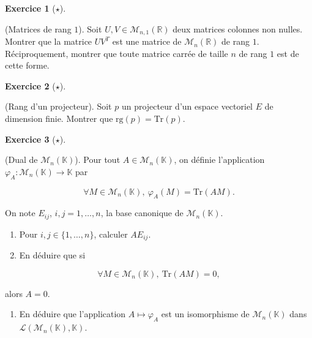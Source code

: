 \documentclass[
  french,
  letterpaper,
  DIV=11,
  numbers=noendperiod]{scrreprt}
\providecommand{\tightlist}{%
  \setlength{\itemsep}{0pt}\setlength{\parskip}{0pt}}
\theoremstyle{plain}
\theoremstyle{definition}
\theoremstyle{plain}
\theoremstyle{plain}
\theoremstyle{definition}
\newtheorem{exercise}{Exercice}[chapter]
\theoremstyle{definition}
\theoremstyle{plain}
\theoremstyle{remark}
\begin{document}
\begin{exercise}[\(\star\)]\protect\hypertarget{exr-03-0007}{}\label{exr-03-0007}

(Matrices de rang \(1\)). Soit \(U,V\in\mathcal{M}_{n,1}(\mathbb{R})\)
deux matrices colonnes non nulles. Montrer que la matrice \(UV^T\) est
une matrice de \(\mathcal{M}_{n}(\mathbb{R})\) de rang \(1\).
Réciproquement, montrer que toute matrice carrée de taille \(n\) de rang
\(1\) est de cette forme.

\end{exercise}

\begin{exercise}[\(\star\)]\protect\hypertarget{exr-03-0004}{}\label{exr-03-0004}

(Rang d'un projecteur). Soit \(p\) un projecteur d'un espace vectoriel
\(E\) de dimension finie. Montrer que
\(\mathrm{rg}(p) = \mathrm{Tr}(p)\).

\end{exercise}

\begin{exercise}[\(\star\)]\protect\hypertarget{exr-03-dual}{}\label{exr-03-dual}

(Dual de \(\mathcal{M}_{n}(\mathbb{K})\)). Pour tout
\(A \in \mathcal{M}_{n}(\mathbb{K})\), on définie l'application
\(\varphi_{A}: \mathcal{M}_{n}(\mathbb{K}) \to \mathbb{K}\) par

\[
   \forall M \in \mathcal{M}_{n}(\mathbb{K}),\ \varphi_A (M) = \mathrm{Tr}(AM).
\]

On note \(E_{ij}\), \(i,j =1,\dots,n\), la base canonique de
\(\mathcal{M}_{n}(\mathbb{K})\).

\begin{enumerate}
\def\labelenumi{\arabic{enumi}.}
\item
  Pour \(i,j \in \{1,\dots,n\}\), calculer \(AE_{ij}\).
\item
  En déduire que si
\end{enumerate}

\[
   \forall M \in \mathcal{M}_{n}(\mathbb{K}),\ \mathrm{Tr}(AM)=0,
\]

alors \(A = 0\).

\begin{enumerate}
\def\labelenumi{\arabic{enumi}.}
\setcounter{enumi}{2}
\tightlist
\item
  En déduire que l'application \(A \mapsto \varphi_{A}\) est un
  isomorphisme de \(\mathcal{M}_{n}(\mathbb{K})\) dans
  \(\mathcal{L}(\mathcal{M}_{n}(\mathbb{K}),\mathbb{K})\).
\end{enumerate}

\end{exercise}
\end{document}
